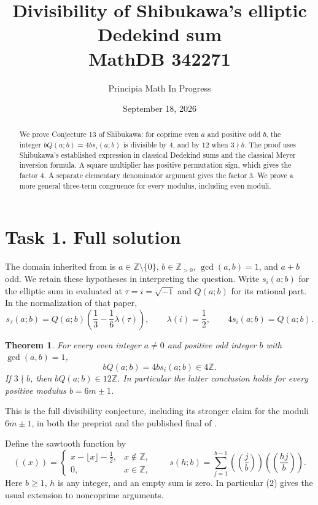 \documentclass[11pt]{article}
\title{Divisibility of Shibukawa's elliptic Dedekind sum\\\large MathDB 342271}
\author{Principia Math In Progress}
\date{September 18, 2026}
\newtheorem{theorem}{Theorem}
\newcommand{\Z}{\mathbb Z}
\newcommand{\saw}[1]{\left(\!\left(#1\right)\!\right)}
\begin{document}
\maketitle
\begin{abstract}
We prove Conjecture 13 of Shibukawa: for coprime even $a$ and positive
odd $b$, the integer $bQ(a;b)=4bs_i(a;b)$ is divisible by $4$, and by
$12$ when $3\nmid b$. The proof uses Shibukawa's established expression
in classical Dedekind sums and the classical Meyer inversion formula.
A square multiplier has positive permutation sign, which gives the
factor $4$. A separate elementary denominator argument gives the
factor $3$. We prove a more general three-term congruence for every
modulus, including even moduli.
\end{abstract}

\section*{Task 1. Full solution}
The domain inherited from \cite{S} is $a\in\Z\setminus\{0\}$,
$b\in\Z_{>0}$, $\gcd(a,b)=1$, and $a+b$ odd. We retain these
hypotheses in interpreting the question. Write $s_i(a;b)$ for the
elliptic sum in \cite{S} evaluated at $\tau=i=\sqrt{-1}$ and $Q(a;b)$
for its rational part. In the normalization of that paper,
\[
 s_\tau(a;b)=Q(a;b)\left(\frac13-\frac16\lambda(\tau)\right),
 \qquad \lambda(i)=\frac12,\qquad 4s_i(a;b)=Q(a;b).                 \tag{1}
\]
\begin{theorem}\label{target}
For every even integer $a\ne0$ and positive odd integer $b$ with
$\gcd(a,b)=1$,
\[
 \boxed{\ bQ(a;b)=4bs_i(a;b)\in4\Z.\ }
\]
If $3\nmid b$, then $bQ(a;b)\in12\Z$. In particular the latter
conclusion holds for every positive modulus $b=6m\pm1$.
\end{theorem}
This is the full divisibility conjecture, including its stronger
claim for the moduli $6m\pm1$, in both the preprint and the published
final of \cite{S}.

Define the sawtooth function by
\[
 \saw{x}=\begin{cases}x-\lfloor x\rfloor-\tfrac12,&x\notin\Z,\\
                              0,&x\in\Z,\end{cases}
 \qquad
 s(h;b)=\sum_{j=1}^{b-1}\saw{\frac jb}\saw{\frac{hj}b}.             \tag{2}
\]
Here $b\ge1$, $h$ is any integer, and an empty sum is zero. In
particular (2) gives the usual extension to noncoprime arguments.
\end{document}
